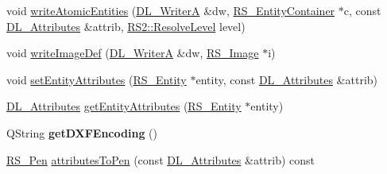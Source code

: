 \begin{DoxyCompactItemize}
\item 
void \hyperlink{classRS__FilterDXF_a6705058dfed48ed15cae029df0c6476e}{write\-Atomic\-Entities} (\hyperlink{classDL__WriterA}{D\-L\-\_\-\-Writer\-A} \&dw, \hyperlink{classRS__EntityContainer}{R\-S\-\_\-\-Entity\-Container} $\ast$c, const \hyperlink{classDL__Attributes}{D\-L\-\_\-\-Attributes} \&attrib, \hyperlink{classRS2_a1b2c5e3a3e9d1b03a9564229255faa20}{R\-S2\-::\-Resolve\-Level} level)
\item 
void \hyperlink{classRS__FilterDXF_a079cc277d50333301438fc86de2cce6f}{write\-Image\-Def} (\hyperlink{classDL__WriterA}{D\-L\-\_\-\-Writer\-A} \&dw, \hyperlink{classRS__Image}{R\-S\-\_\-\-Image} $\ast$i)
\item 
void \hyperlink{classRS__FilterDXF_a497c03353f14e3593d38cc8d4aad8d22}{set\-Entity\-Attributes} (\hyperlink{classRS__Entity}{R\-S\-\_\-\-Entity} $\ast$entity, const \hyperlink{classDL__Attributes}{D\-L\-\_\-\-Attributes} \&attrib)
\item 
\hyperlink{classDL__Attributes}{D\-L\-\_\-\-Attributes} \hyperlink{classRS__FilterDXF_a9567bfd3bf0beb49149b37829be9002e}{get\-Entity\-Attributes} (\hyperlink{classRS__Entity}{R\-S\-\_\-\-Entity} $\ast$entity)
\item 
\hypertarget{classRS__FilterDXF_a2f4b83e87685118afd5a4959e622680e}{Q\-String {\bfseries get\-D\-X\-F\-Encoding} ()}\label{classRS__FilterDXF_a2f4b83e87685118afd5a4959e622680e}

\item 
\hyperlink{classRS__Pen}{R\-S\-\_\-\-Pen} \hyperlink{classRS__FilterDXF_a9aff2ab9d499ec9a5d239f4dbe602e95}{attributes\-To\-Pen} (const \hyperlink{classDL__Attributes}{D\-L\-\_\-\-Attributes} \&attrib) const 
\end{DoxyCompactItemize}
